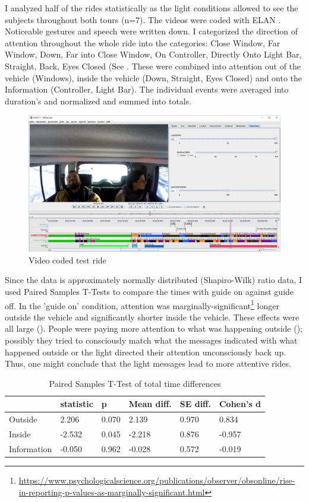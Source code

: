 I analyzed half of the rides statistically as the light conditions allowed to see the subjects throughout both tours (n=7). The videos were coded with ELAN \citep{Wittenburg2006ELAN:Research}. Noticeable gestures and speech were written down. I categorized the direction of attention throughout the whole ride into the categories: Close Window, Far Window, Down, Far into Close Window, On Controller, Directly Onto Light Bar, Straight, Back, Eyes Closed (See \emph{}. These were combined into attention out of the vehicle (Windows), inside the vehicle (Down, Straight, Eyes Closed) and onto the Information (Controller, Light Bar). The individual events were averaged into duration's and normalized and summed into totals.
\begin{figure}
    \includegraphics[width=1\textwidth]{fig/StefSas.JPG}
    \caption[Video Coding]{Video coded test ride}
    \label{fig:videocode}
\end{figure}
Since the data is approximately normally distributed (Shapiro-Wilk) ratio data, I used Paired Samples T-Tests to compare the times with guide on against guide off. In the 'guide on' condition, attention was marginally-significant\footnote{\url{https://www.psychologicalscience.org/publications/observer/obsonline/rise-in-reporting-p-values-as-marginally-significant.html}} longer outside the vehicle and significantly shorter inside the vehicle. These effects were all large (\emph{}). People were paying more attention to what was happening outside (\emph{}); possibly they tried to consciously match what the messages indicated with what happened outside or the light directed their attention unconsciously back up. Thus, one might conclude that the light messages lead to more attentive rides. 

\begin{table}
\label{tab:totalVideo}
  \caption{Paired Samples T-Test of total time differences}
\begin{tabular}{@{}llllll@{}}
\toprule
 & statistic &  p & Mean diff. & SE diff. & Cohen's d \\ \midrule
Outside & 2.206 &  0.070 & 2.139 & 0.970 & 0.834 \\
Inside & -2.532 &  0.045 & -2.218 & 0.876 & -0.957 \\
Information & -0.050 &  0.962 & -0.028 & 0.572 & -0.019 \\ \bottomrule
\end{tabular}
\end{table}

